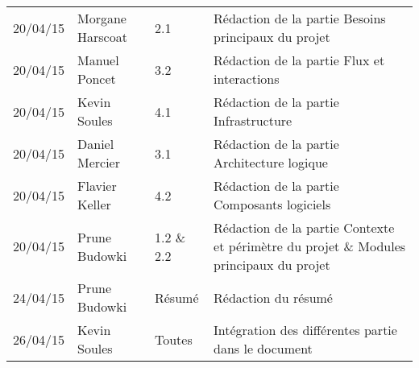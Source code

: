 \small
\begin{tabular}{|p{1.7cm}| >{\raggedright}p{3.1cm}| >{\raggedright}p{2.8cm}|p{7.7cm}|}
  \hline
  \rowcolor{Gainsboro} \color{Navy}{\bfseries Date}  & \color{Navy}{\bfseries Auteur} & \color{Navy}{\bfseries Section(s)}  &\color{Navy}{\bfseries Commentaires} \\
  \hline
  20/04/15 & Morgane Harscoat & 2.1 & Rédaction de la partie Besoins principaux du projet\\
  \hline
  20/04/15 & Manuel Poncet & 3.2 & Rédaction de la partie Flux et interactions \\
  \hline
  20/04/15 & Kevin Soules & 4.1 & Rédaction de la partie Infrastructure\\
  \hline
  20/04/15 & Daniel Mercier & 3.1 & Rédaction de la partie Architecture logique\\
  \hline
  20/04/15 & Flavier Keller & 4.2 & Rédaction de la partie Composants logiciels \\
  \hline
  20/04/15 & Prune Budowki & 1.2 \& 2.2 & Rédaction de la partie Contexte et périmètre du projet \& Modules principaux du projet\\
  \hline
  24/04/15 & Prune Budowki & Résumé & Rédaction du résumé\\
  \hline
  26/04/15 & Kevin Soules & Toutes & Intégration des différentes partie dans le document\\
  \hline
\end{tabular}
\normalsize
